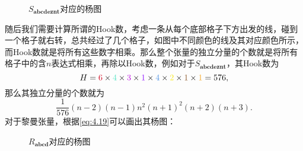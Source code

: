 \begin{figure}[h]
	\centering
	
	\caption{$S_{\boldsymbol{abcdeznt}}$对应的杨图}
	\label{fig:young tablex of S}
\end{figure}

随后我们需要计算所谓的Hook数，考虑一条从每个底部格子下方出发的线，碰到一个格子就右转，总共经过了几个格子，如图中不同颜色的线及其对应颜色所示，而Hook数就是将所有这些数字相乘。那么整个张量的独立分量的个数就是将所有格子中的含$n$表达式相乘，再除以Hook数，例如对于$S_{\boldsymbol{abcdeznt}}$，其Hook数为
\begin{equation*}
	H=\textcolor[rgb]{0.82,0.01,0.11}{6} \times \textcolor[rgb]{0.31,0.89,0.76}{4} \times \textcolor[rgb]{0.74,0.06,0.88}{3} \times \textcolor[rgb]{0.56,0.07,1}{1} \times \textcolor[rgb]{0.29,0.56,0.89}{4} \times \textcolor[rgb]{0.97,0.91,0.11}{2} \times \textcolor[rgb]{0.55,0.34,0.16}{1} \times \textcolor[rgb]{0.96,0.65,0.14}{1} =576,
\end{equation*}
那么其独立分量的个数就为
\begin{equation*}
	\frac{1}{576}( n-2)( n-1) n^{2}( n+1)^{2}( n+2)( n+3) .
\end{equation*}
对于黎曼张量，根据\ref{eq:4.19}可以画出其杨图：

\begin{figure}[h]
	\centering
	
	\caption{$R_{\boldsymbol{abcd}}$对应的杨图}
	\label{fig:young tablex of R}
\end{figure}


